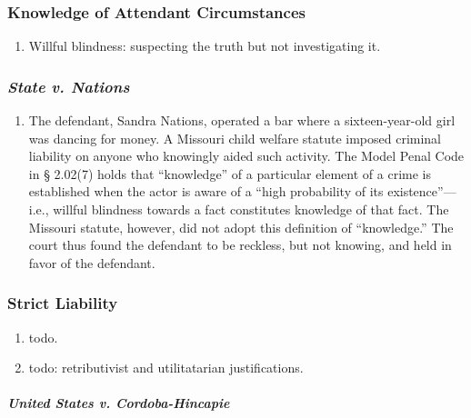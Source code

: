 \subsubsection{Knowledge of Attendant Circumstances}

\begin{enumerate}
    \item Willful blindness: suspecting the truth but not investigating it.
\end{enumerate}

\subsubsection{\emph{State v. Nations}}

\begin{enumerate}
    \item The defendant, Sandra Nations, operated a bar where a sixteen-year-old girl was dancing for money. A Missouri child welfare statute imposed criminal liability on anyone who knowingly aided such activity. The Model Penal Code in § 2.02(7) holds that ``knowledge'' of a particular element of a crime is established when the actor is aware of a ``high probability of its existence''---i.e., willful blindness towards a fact constitutes knowledge of that fact. The Missouri statute, however, did not adopt this definition of ``knowledge.'' The court thus found the defendant to be reckless, but not knowing, and held in favor of the defendant.
\end{enumerate}

\subsubsection{Strict Liability}

\begin{enumerate}
    \item todo.
    \item todo: retributivist and utilitatarian justifications.
\end{enumerate}

\paragraph{\emph{United States v. Cordoba-Hincapie}}

